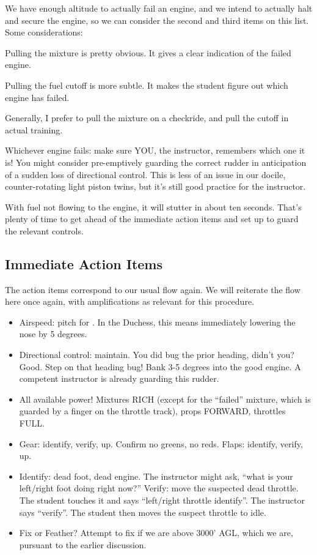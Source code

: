 We have enough altitude to actually fail an engine, and we intend to actually halt and secure the engine, so we can consider the second and third items on this list. Some considerations:

Pulling the mixture is pretty obvious. It gives a clear indication of the failed engine.

Pulling the fuel cutoff is more subtle. It makes the student figure out which engine has failed.

Generally, I prefer to pull the mixture on a checkride, and pull the cutoff in actual training.

Whichever engine fails: make sure YOU, the instructor, remembers which one it is! You might consider pre-emptively guarding the correct rudder in anticipation of a sudden loss of directional control. This is less of an issue in our docile, counter-rotating light piston twins, but it's still good practice for the instructor.

With fuel not flowing to the engine, it will stutter in about ten seconds. That's plenty of time to get ahead of the immediate action items and set up to guard the relevant controls.

\subsection{Immediate Action Items}

The action items correspond to our usual flow again. We will reiterate the flow here once again, with amplifications as relevant for this procedure.

\begin{itemize}
    \item Airspeed: pitch for \vyse. In the Duchess, this means immediately lowering the nose by 5 degrees.
    \item Directional control: maintain. You did bug the prior heading, didn't you? Good. Step on that heading bug! Bank 3-5 degrees into the good engine. A competent instructor is already guarding this rudder.
    \item All available power! Mixtures RICH (except for the ``failed'' mixture, which is guarded by a finger on the throttle track), props FORWARD, throttles FULL.
    \item Gear: identify, verify, up. Confirm no greens, no reds. Flaps: identify, verify, up.
    \item Identify: dead foot, dead engine. The instructor might ask, ``what is your left/right foot doing right now?'' Verify: move the suspected dead throttle. The student touches it and says ``left/right throttle identify''. The instructor says ``verify''. The student then moves the suspect throttle to idle.
    \item Fix or Feather? Attempt to fix if we are above 3000' AGL, which we are, pursuant to the earlier discussion.
\end{itemize}

